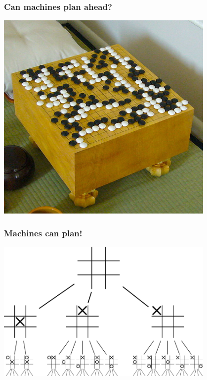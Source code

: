 \documentclass{beamer}
\newcommand{\pnote}[1] {}
\begin{document}
\begin{frame}
  \frametitle{Can machines plan ahead?}
  \begin{center}
    \includegraphics[width=0.8\textwidth]{figures/619px-FloorGoban}
  \end{center}
\end{frame}

\pnote{I suppose the first question for experiment design is whether machines can plan
ahead. Indeed, even for large problems, such as Go, machines can
now perform at least as well as top-rated humans. How is this
 achieved?}


\begin{frame}
  \frametitle{Machines can plan!}
  \begin{center}
    \includegraphics[width=0.8\textwidth]{figures/Tic-tac-toe-game-tree}
  \end{center}
\end{frame}
\pnote{The basic construction is the planning tree. This is an enumeration
of all possible future events. If a complete enumeration is
impossible, a partial tree is constructed. However this requires
evaluating non-terminal game positions. In the past, this was
done with heuristics, but now this is data-driven, both through the
use of expert databases, and through self-play and reinforcement
learning.}
\end{document}
